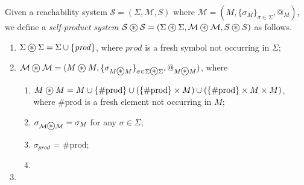 \documentclass{article}
\newcommand\oast{\stackMath\mathbin{\stackinset{c}{0ex}{c}{0ex}{\ast}{\bigcirc}}}
\begin{document}
\begin{definition}\label{def:RLproduct}
Given a reachability system $\mathcal{S} = (\Sigma, \mathcal{M}, S)$
where $\mathcal{M} = (M, \{\sigma_M\}_{\sigma \in \Sigma}, @_M)$,
we define a \emph{self-product system}
$\mathcal{S}\oast{}\mathcal{S} = (\Sigma\oast{}\Sigma, \mathcal{M}\oast{}\mathcal{M}, S\oast{}S)$ as follows.
\begin{enumerate}
    \item $\Sigma\oast{}\Sigma = \Sigma \cup \{ \mathit{prod} \}$, where $\mathit{prod}$ is a fresh symbol not occurring in $\Sigma$;
    \item $\mathcal{M}\oast{}\mathcal{M} = (M\oast{}M, \{\sigma_{M\oast{}M}\}_{\sigma \in \Sigma\oast{}\Sigma}, @_{M\oast{}M})$, where
    \begin{enumerate}
        \item $M\oast{}M = M \cup \{ \mathrm{\#prod} \} \cup (\{ \mathrm{\#prod} \} \times M) \cup (\{ \mathrm{\#prod} \} \times M \times M)$, where $\mathrm{\#prod}$ is a fresh element not occurring in $M$; 
        \item $\sigma_{\mathcal{M} \oast \mathcal{M}} = \sigma_M$ for any $\sigma \in \Sigma$;
        \item $\sigma_{\mathit{prod}}$ = $\mathrm{\#prod}$;
        \item 
    \end{enumerate}
    \item 
\end{enumerate}
\end{definition}
\end{document}
